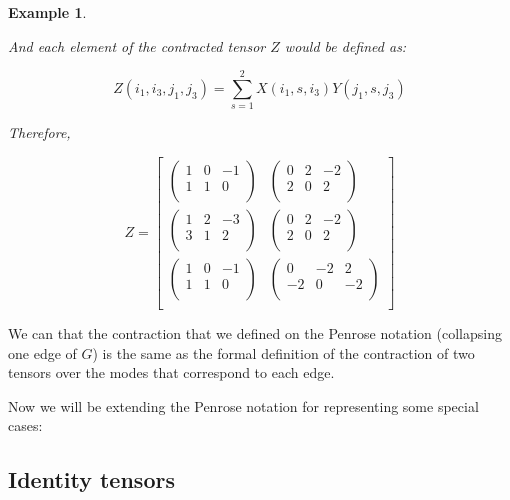 \documentclass[11pt,a4paper,openright,oneside]{book}
\numberwithin{equation}{section}
\newtheorem{example0}[defn0]{Example}
\newenvironment{example}{ \begin{example0}\rm}{\end{example0}}
\begin{document}
\begin{example}
\begin{center}
    \end{center}

And each element of the contracted tensor $Z$ would be defined as:

$$Z(i_1, i_3, j_1, j_3) = \sum_{s=1}^2 X(i_1, s, i_3) Y(j_1, s, j_3)$$

Therefore,

$$Z = \begin{bmatrix}
\begin{pmatrix}
    1 & 0 & -1 \\
    1 & 1 & 0 \\
\end{pmatrix} &
\begin{pmatrix}
    0 & 2 & -2 \\
    2 & 0 & 2 \\
\end{pmatrix} \\
\begin{pmatrix}
    1 & 2 & -3 \\
    3 & 1 & 2 \\
\end{pmatrix} &
\begin{pmatrix}
    0 & 2 & -2 \\
    2 & 0 & 2 \\
\end{pmatrix} \\
\begin{pmatrix}
    1 & 0 & -1 \\
    1 & 1 & 0 \\
\end{pmatrix} &
\begin{pmatrix}
    0 & -2 & 2 \\
    -2 & 0 & -2 \\
\end{pmatrix} \\
\end{bmatrix}$$
\label{ex:bigmatrix}
\end{example}

We can that the contraction that we defined on
the Penrose notation (collapsing one edge of $G$) is the same as the formal definition of the contraction of two tensors over
the modes that correspond to each edge.

Now we will be extending the Penrose notation for representing some special cases:

\subsection* {Identity tensors}
\end{document}
